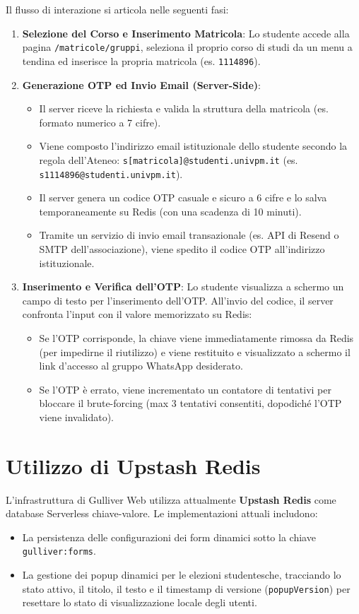 \documentclass[11pt,a4paper,oneside]{article}
\begin{document}
Il flusso di interazione si articola nelle seguenti fasi:
\begin{enumerate}
    \item \textbf{Selezione del Corso e Inserimento Matricola}: Lo studente accede alla pagina \texttt{/matricole/gruppi}, seleziona il proprio corso di studi da un menu a tendina ed inserisce la propria matricola (es. \texttt{1114896}).
    \item \textbf{Generazione OTP ed Invio Email (Server-Side)}:
    \begin{itemize}
        \item Il server riceve la richiesta e valida la struttura della matricola (es. formato numerico a 7 cifre).
        \item Viene composto l'indirizzo email istituzionale dello studente secondo la regola dell'Ateneo: \texttt{s[matricola]@studenti.univpm.it} (es. \texttt{s1114896@studenti.univpm.it}).
        \item Il server genera un codice OTP casuale e sicuro a 6 cifre e lo salva temporaneamente su Redis (con una scadenza di 10 minuti).
        \item Tramite un servizio di invio email transazionale (es. API di Resend o SMTP dell'associazione), viene spedito il codice OTP all'indirizzo istituzionale.
    \end{itemize}
    \item \textbf{Inserimento e Verifica dell'OTP}: Lo studente visualizza a schermo un campo di testo per l'inserimento dell'OTP. All'invio del codice, il server confronta l'input con il valore memorizzato su Redis:
    \begin{itemize}
        \item Se l'OTP corrisponde, la chiave viene immediatamente rimossa da Redis (per impedirne il riutilizzo) e viene restituito e visualizzato a schermo il link d'accesso al gruppo WhatsApp desiderato.
        \item Se l'OTP è errato, viene incrementato un contatore di tentativi per bloccare il brute-forcing (max 3 tentativi consentiti, dopodiché l'OTP viene invalidato).
    \end{itemize}
\end{enumerate}

\section{Utilizzo di Upstash Redis}
L'infrastruttura di Gulliver Web utilizza attualmente \textbf{Upstash Redis} come database Serverless chiave-valore. Le implementazioni attuali includono:
\begin{itemize}
    \item La persistenza delle configurazioni dei form dinamici sotto la chiave \texttt{gulliver:forms}.
    \item La gestione dei popup dinamici per le elezioni studentesche, tracciando lo stato attivo, il titolo, il testo e il timestamp di versione (\texttt{popupVersion}) per resettare lo stato di visualizzazione locale degli utenti.
\end{itemize}
\end{document}
